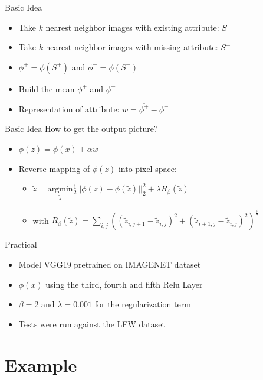\documentclass[11pt]{beamer}
\begin{document}
\begin{frame}{Basic Idea}
	\begin{itemize}
		\item Take $k$ nearest neighbor images with existing attribute: $S^+$
		\item Take $k$ nearest neighbor images with missing attribute: $S^-$
		\vfill
		\pause
		
		\item $\phi^+ = \phi(S^+)$ and $\phi^- = \phi(S^-)$
		\item Build the mean $\overline{\phi^+}$ and $\overline{\phi^-}$
		\vfill
		\pause 
		
		\item Representation of attribute: $w=\overline{\phi^+}-\overline{\phi^-}$
	\end{itemize}
\end{frame}

\begin{frame}{Basic Idea}
	How to get the output picture?
	
	\vfill
	\pause
	
	\begin{itemize}
		\item $\phi(z) = \phi(x) + \alpha w$
		\item Reverse mapping of $\phi(z)$ into pixel space:
		
		\vfill
		\pause
		\begin{itemize}
			\item $\tilde{z} = \underset{\tilde{z}}{\mathrm{argmin}} \frac{1}{2} ||\phi(z)-\phi(\tilde{z})||_2^2 + \lambda R_{\beta}(\tilde{z})$ 
			\item with $R_{\beta}(\tilde{z}) = \sum_{i,j}((\tilde{z}_{i,j+1}-\tilde{z}_{i,j})^2 + (\tilde{z}_{i+1,j}-\tilde{z}_{i,j})^2)^{\frac{\beta}{2}}$
		\end{itemize}
		
		 
	\end{itemize}
	
\end{frame}

\begin{frame}{Practical}
	\begin{itemize}
		\item Model VGG19 pretrained on IMAGENET dataset
		\item $\phi(x)$ using the third, fourth and fifth Relu Layer
		\item $\beta=2$ and $\lambda = 0.001$ for the regularization term
		\item Tests were run against the LFW dataset
	\end{itemize} 
\end{frame}

\section{Example}

\end{document}
